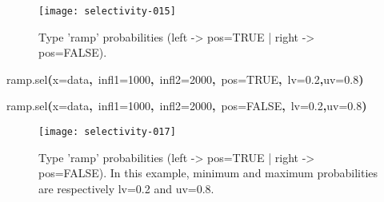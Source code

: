 \documentclass[letterpaper, 12pt]{article}
\newenvironment{Hinput}%
{}%
{}%
\newenvironment{Hchunk}%
{\vspace{0.5em}\par\begin{flushleft}}%
{\end{flushleft}}%
\newcommand{\hlnumber}[1]{\textcolor[rgb]{0.0823529411764706,0.0784313725490196,0.709803921568627}{#1}}%
\newcommand{\hlfunctioncall}[1]{\textcolor[rgb]{1,0,0}{#1}}%
\newcommand{\hlkeyword}[1]{\textcolor[rgb]{0,0,0}{\textbf{#1}}}%
\newcommand{\hlargument}[1]{\textcolor[rgb]{0.694117647058824,0.247058823529412,0.0196078431372549}{#1}}%
\newcommand{\hlsymbol}[1]{\textcolor[rgb]{0,0,0}{#1}}%
\newcommand{\hlprompt}[1]{\textcolor[rgb]{0,0,0}{#1}}%
\begin{document}
\begin{figure}[h]
\vspace{-20pt}
\begin{center}
\texttt{[image: selectivity-015]}
\end{center}
\vspace{-30pt}
\caption{Type 'ramp' probabilities (left -> pos=TRUE |  right -> pos=FALSE).}
\vspace{-10pt}
\label{fig7}
\end{figure}

\vspace*{\fill}
\newpage


\begin{Hchunk}
\begin{normalsize}
\begin{Hinput}
\ttfamily\noindent
\hlprompt{\usebox{\hlnormalsizeboxgreaterthan}{\ }}\hlfunctioncall{ramp.sel}\hlkeyword{(}\hlargument{x}\hlargument{=}\hlsymbol{data}\hlkeyword{,}{\ }\hlargument{infl1}\hlargument{=}\hlnumber{1000}\hlkeyword{,}{\ }\hlargument{infl2}\hlargument{=}\hlnumber{2000}\hlkeyword{,}{\ }\hlargument{pos}\hlargument{=}\hlnumber{TRUE}\hlkeyword{,}{\ }\hlargument{lv}\hlargument{=}\hlnumber{0.2}\hlkeyword{,}\hlargument{uv}\hlargument{=}\hlnumber{0.8}\hlkeyword{)}\mbox{}
\normalfont
\end{Hinput}


\begin{Hinput}
\ttfamily\noindent
\hlprompt{\usebox{\hlnormalsizeboxgreaterthan}{\ }}\hlfunctioncall{ramp.sel}\hlkeyword{(}\hlargument{x}\hlargument{=}\hlsymbol{data}\hlkeyword{,}{\ }\hlargument{infl1}\hlargument{=}\hlnumber{1000}\hlkeyword{,}{\ }\hlargument{infl2}\hlargument{=}\hlnumber{2000}\hlkeyword{,}{\ }\hlargument{pos}\hlargument{=}\hlnumber{FALSE}\hlkeyword{,}{\ }\hlargument{lv}\hlargument{=}\hlnumber{0.2}\hlkeyword{,}\hlargument{uv}\hlargument{=}\hlnumber{0.8}\hlkeyword{)}\mbox{}
\normalfont
\end{Hinput}


\end{normalsize}
\end{Hchunk}


\begin{figure}[h]
\vspace{-20pt}
\begin{center}
\texttt{[image: selectivity-017]}
\end{center}
\vspace{-30pt}
\caption{Type 'ramp' probabilities (left -> pos=TRUE |  right -> pos=FALSE). In this example, minimum and maximum probabilities are respectively lv=0.2 and uv=0.8.}
\vspace{-10pt}
\label{fig8}
\end{figure}
\end{document}
